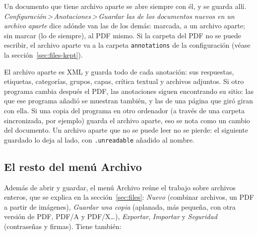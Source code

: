 \documentclass[12pt,
              article,
              oneside
              ]{memoir}
\newcommand*{\menu}[1]{\textit{#1}}
\newcommand*{\then}{\,>\,}
\begin{document}
%
Un documento que tiene archivo aparte se abre siempre con él, y se guarda
allí. \menu{Configuración\then Anotaciones\then Guardar las de los
documentos nuevos en un archivo aparte} dice adónde van las de los demás: marcada, a un
archivo aparte; sin marcar (lo de siempre), al PDF mismo. Si la carpeta del PDF no se puede escribir, el archivo
aparte va a la carpeta \texttt{annotations} de la configuración (véase la
sección~\ref{sec:files-kept}).

El archivo aparte es XML y guarda todo de cada anotación: sus respuestas,
etiquetas, categorías, grupos, capas, crítica textual y archivos adjuntos.
Si otro programa cambia después el PDF, las anotaciones siguen encontrando
su sitio: las que ese programa añadió se muestran también, y las de una
página que giró giran con ella. Si una copia del programa en otro
ordenador (a través de una carpeta sincronizada, por ejemplo) guarda el
archivo aparte, eso se nota como un cambio del documento. Un archivo
aparte que no se puede leer no se pierde: el siguiente guardado lo deja al
lado, con \texttt{.unreadable} añadido al nombre.

\subsection{El resto del menú Archivo}

%
Además de abrir y guardar, el menú Archivo reúne el trabajo sobre archivos
enteros, que se explica en la sección~\ref{sec:files}: \menu{Nuevo}
(combinar archivos, un PDF a partir de imágenes), \menu{Guardar una copia}
(aplanada, más pequeña, con otra versión de PDF, PDF/A y PDF/X\ldots),
\menu{Exportar}, \menu{Importar} y \menu{Seguridad} (contraseñas y firmas).
Tiene también:
\end{document}
